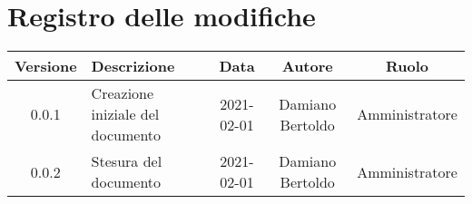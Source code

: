 \section*{Registro delle modifiche}

\begin{center}
	\begin{longtable}{|c|p{5cm}|c|c|c|}
	\hline
	\rowcolor{lighter-grayer}
	\textbf{Versione} & \textbf{Descrizione} & \textbf{Data} & \textbf{Autore} & \textbf{Ruolo} \\
	\hline
	\endfirsthead


	\hline
	0.0.1 & Creazione iniziale del documento & 2021-02-01 & Damiano Bertoldo & Amministratore \\
	\hline
	0.0.2 & Stesura del documento & 2021-02-01 & Damiano Bertoldo & Amministratore \\
	\hline
	\end{longtable}
\end{center}